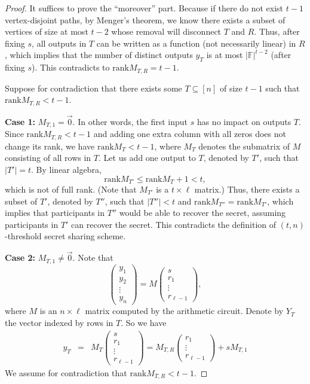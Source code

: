 \documentclass[10pt,a4paper]{amsart}
\newcommand{\rank}{\mathrm{rank}}
\begin{document}
\begin{proof}
It suffices to prove the ``moreover'' part. Because if there do not exist $t-1$ vertex-disjoint paths, by Menger's theorem, we know there exists a subset of vertices of size at most $t-2$ whose removal will disconnect $T$ and $R$. Thus, after fixing $s$, all outputs in $T$ can be written as a function (not necessarily linear) in $R$, which implies that the number of distinct outputs $y_T$ is at most $|\mathbb{F}|^{t-2}$ (after fixing $s$). This contradicts to 
$\rank M_{T, R} = t-1$.

Suppose for contradiction that there exists some $T \subseteq [n]$ of size $t-1$ such that $\rank M_{T, R} < t-1$.

\textbf{Case 1:} $M_{T, 1} = \vec{0}$. In other words, the first input $s$ has no impact on outputs $T$. Since $\rank{M_{T, R}} < t-1$ and adding one extra column with all zeros does not change its rank, we have $\rank{M_{T}} < t-1$, where $M_T$ denotes the submatrix of $M$ consisting of all rows in $T$. Let us add one output to $T$, denoted by $T'$, such that $|T'| = t$. By linear algebra,
\[
\rank{M_{T'}} \le \rank{M_{T}} + 1 < t,
\]
which is not of full rank. (Note that $M_{T'}$ is a $t \times \ell$ matrix.) Thus, there exists a subset of $T'$, denoted by $T''$, such that $|T''| < t$ and $\rank{M_{T''}} = \rank{M_{T'}}$, which implies that participants in $T''$ would be able to recover the secret, assuming participants in $T'$ can recover the secret. This contradicts the definition of $(t, n)$-threshold secret sharing scheme.

\textbf{Case 2:} $M_{T, 1} \not= \vec{0}$. Note that
\[
\begin{pmatrix}
y_1 \\
y_2 \\
\vdots \\
y_n
\end{pmatrix}
=
M
\begin{pmatrix}
s \\
r_1 \\
\vdots \\
r_{\ell-1}
\end{pmatrix},
\]
where $M$ is an $n \times \ell$ matrix computed by the arithmetic circuit. Denote by $Y_T$ the vector indexed by rows in $T$. So we have
\begin{eqnarray*}
y_T
& = &
M_{T}
\begin{pmatrix}
s \\
r_1 \\
\vdots \\
r_{\ell-1}
\end{pmatrix} 
 =  M_{T, R} \begin{pmatrix}
r_1 \\
\vdots \\
r_{\ell-1}
\end{pmatrix}
+
sM_{T, 1}
\end{eqnarray*}
We assume for contradiction that $\rank M_{T, R} < t-1$.


\end{proof}
\end{document}
